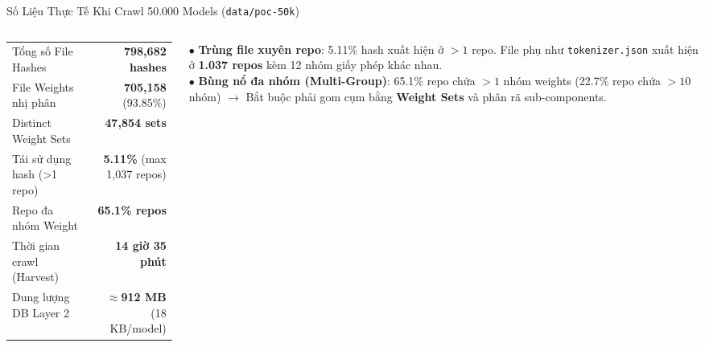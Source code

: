 \documentclass[aspectratio=169, xcolor=table]{beamer}
\begin{document}
\begin{frame}{Số Liệu Thực Tế Khi Crawl 50.000 Models (\texttt{data/poc-50k})}
\begin{columns}[onlytextwidth, T]
\begin{column}{0.53\textwidth}
{\begin{tabular}{l r}
                Tổng số File Hashes & \textbf{798,682 hashes} \\
                File Weights nhị phân & \textbf{705,158} (93.85\%) \\
                Distinct Weight Sets & \textbf{47,854 sets} \\
                Tái sử dụng hash (>1 repo) & \textbf{5.11\%} (max 1,037 repos) \\
                Repo đa nhóm Weight & \textbf{65.1\% repos} \\
                Thời gian crawl (Harvest) & \textbf{14 giờ 35 phút} \\
                Dung lượng DB Layer 2 & \textbf{$\approx$912 MB} (18 KB/model) \\
                \bottomrule
            \end{tabular}
            }
        \end{column}
        \hfill
        \begin{column}{0.44\textwidth}
            \begin{infobox}
                \scriptsize
                $\bullet$ \textbf{Trùng file xuyên repo}: 5.11\% hash xuất hiện ở $>1$ repo. File phụ như \texttt{tokenizer.json} xuất hiện ở \textbf{1.037 repos} kèm 12 nhóm giấy phép khác nhau.\\[5pt]
                $\bullet$ \textbf{Bùng nổ đa nhóm (Multi-Group)}: 65.1\% repo chứa $>1$ nhóm weights (22.7\% repo chứa $>10$ nhóm) $\to$ Bắt buộc phải gom cụm bằng \textbf{Weight Sets} và phân rã sub-components.
            \end{infobox}
        \end{column}
    \end{columns}
\end{frame}
\end{document}
